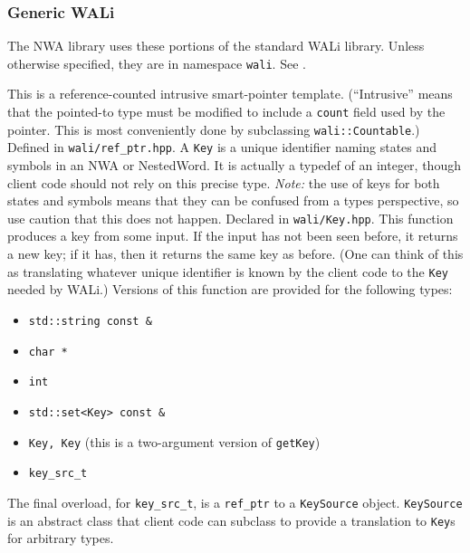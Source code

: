 \subsubsection{Generic WALi}

The NWA library uses these portions of the standard WALi library. Unless
otherwise specified, they are in namespace \texttt{wali}. See \cite{wali}.

\begin{functionlist}
   This is a reference-counted intrusive
    smart-pointer template. (``Intrusive'' means that the pointed-to type
    must be modified to include a \texttt{count} field used by the
    pointer. This is most conveniently done by subclassing
    \texttt{wali::Countable}.) Defined in \texttt{wali/ref\_ptr.hpp}.
   A \texttt{Key} is a unique identifier naming states and symbols in an
    NWA or NestedWord. It is actually a typedef of an integer, though client
    code should not rely on this precise type. \textsl{Note:} the use of keys for both
    states and symbols means that they can be confused from a types
    perspective, so use caution that this does not happen. Declared in
    \texttt{wali/Key.hpp}.
   This function produces a key from some input. If
    the input has not been seen before, it returns a new key; if it has, then
    it returns the same key as before. (One can think of this as translating
    whatever unique identifier is known by the client code to the
    \texttt{Key} needed by WALi.) Versions of this function are provided for
    the following types:
    \begin{itemize}
      \item \texttt{std::string const \&}
      \item \texttt{char *}
      \item \texttt{int}
      \item \texttt{std::set<Key> const \&}
      \item \texttt{Key, Key} (this is a two-argument version of
        \texttt{getKey})
      \item \texttt{key\_src\_t}
    \end{itemize}

    The final overload, for \texttt{key\_src\_t}, is a \texttt{ref\_ptr} to a
    \texttt{KeySource} object. \texttt{KeySource} is an abstract class that
    client code can subclass to provide a translation to \texttt{Key}s for
    arbitrary types.


\end{functionlist}
